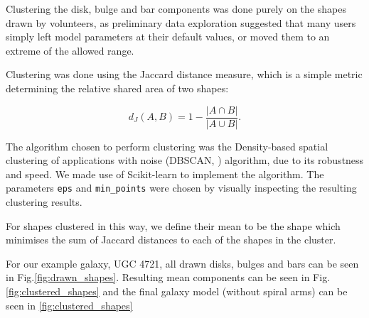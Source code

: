 \documentclass[../main.tex]{subfiles}
\begin{document}
Clustering the disk, bulge and bar components was done purely on the shapes drawn by volunteers, as preliminary data exploration suggested that many users simply left model parameters at their default values, or moved them to an extreme of the allowed range.

Clustering was done using the Jaccard distance measure, which is a simple metric determining the relative shared area of two shapes:

\begin{equation}
d_J(A, B) = 1 - \frac{|A \cap B|}{|A \cup B|}.
\end{equation}

The algorithm chosen to perform clustering was the Density-based spatial clustering of applications with noise (DBSCAN, \citealt{dbscan}) algorithm, due to its robustness and speed. We made use of Scikit-learn \cite{scikit-learn} to implement the algorithm. The parameters \texttt{eps} and \texttt{min\_points} were chosen by visually inspecting the resulting clustering results.

For shapes clustered in this way, we define their mean to be the shape which minimises the sum of Jaccard distances to each of the shapes in the cluster.

%
%
%
%

For our example galaxy, UGC 4721, all drawn disks, bulges and bars can be seen in Fig.\ref{fig:drawn_shapes}. Resulting mean components can be seen in Fig.\ref{fig:clustered_shapes} and the final galaxy model (without spiral arms) can be seen in \ref{fig:clustered_shapes}
\end{document}
